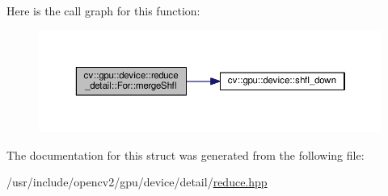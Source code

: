 Here is the call graph for this function\-:\nopagebreak
\begin{figure}[H]
\begin{center}
\leavevmode
\includegraphics[width=350pt]{structcv_1_1gpu_1_1device_1_1reduce__detail_1_1For_aa4a8db1757215f7e95f081c6ec0dfc74_cgraph}
\end{center}
\end{figure}




The documentation for this struct was generated from the following file\-:\begin{DoxyCompactItemize}
\item 
/usr/include/opencv2/gpu/device/detail/\hyperlink{detail_2reduce_8hpp}{reduce.\-hpp}\end{DoxyCompactItemize}
